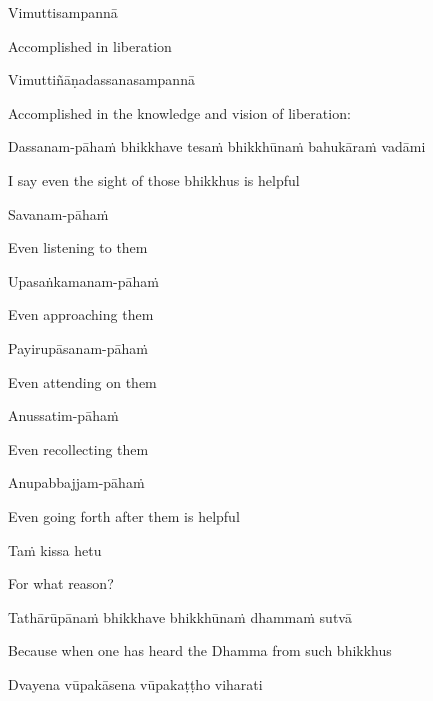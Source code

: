 Vimuttisampannā

\begin{cprenglish}
  Accomplished in liberation
\end{cprenglish}

Vimuttiñāṇadassanasampannā

\begin{cprenglish}
  Accomplished in the knowledge and vision of liberation:
\end{cprenglish}

Dassanam-pāhaṁ bhikkhave tesaṁ bhikkhūnaṁ bahukāraṁ vadāmi

\begin{cprenglish}
  I say even the sight of those bhikkhus is helpful
\end{cprenglish}

Savanam-pāhaṁ

\begin{cprenglish}
  Even listening to them
\end{cprenglish}

Upasaṅkamanam-pāhaṁ

\begin{cprenglish}
  Even approaching them
\end{cprenglish}

Payirupāsanam-pāhaṁ

\begin{cprenglish}
  Even attending on them
\end{cprenglish}

Anussatim-pāhaṁ

\begin{cprenglish}
  Even recollecting them
\end{cprenglish}

Anupabbajjam-pāhaṁ

\begin{cprenglish}
  Even going forth after them is helpful
\end{cprenglish}

Taṁ kissa hetu

\begin{cprenglish}
  For what reason?
\end{cprenglish}

Tathārūpānaṁ bhikkhave bhikkhūnaṁ dhammaṁ sutvā

\begin{cprenglish}
  Because when one has heard the Dhamma from such bhikkhus
\end{cprenglish}

Dvayena vūpakāsena vūpakaṭṭho viharati

